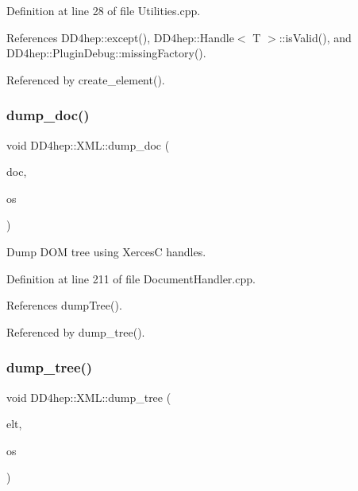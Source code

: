Definition at line 28 of file Utilities.\+cpp.



References D\+D4hep\+::except(), D\+D4hep\+::\+Handle$<$ T $>$\+::is\+Valid(), and D\+D4hep\+::\+Plugin\+Debug\+::missing\+Factory().



Referenced by create\+\_\+element().

\hypertarget{namespace_d_d4hep_1_1_x_m_l_ae465472cdddbe11a365f14b04b15b191}{}\label{namespace_d_d4hep_1_1_x_m_l_ae465472cdddbe11a365f14b04b15b191} 
\subsubsection{\texorpdfstring{dump\+\_\+doc()}{dump\_doc()}}
{\footnotesize\ttfamily void D\+D4hep\+::\+X\+M\+L\+::dump\+\_\+doc (\begin{DoxyParamCaption}\item[{D\+O\+M\+Document $\ast$}]{doc,  }\item[{ostream \&}]{os }\end{DoxyParamCaption})}



Dump D\+OM tree using XercesC handles. 



Definition at line 211 of file Document\+Handler.\+cpp.



References dump\+Tree().



Referenced by dump\+\_\+tree().

\hypertarget{namespace_d_d4hep_1_1_x_m_l_a1130069b87e258d98105350c812835dd}{}\label{namespace_d_d4hep_1_1_x_m_l_a1130069b87e258d98105350c812835dd} 
\subsubsection{\texorpdfstring{dump\+\_\+tree()}{dump\_tree()}\hspace{0.1cm}{\footnotesize\ttfamily [1/6]}}
{\footnotesize\ttfamily void D\+D4hep\+::\+X\+M\+L\+::dump\+\_\+tree (\begin{DoxyParamCaption}\item[{\hyperlink{class_d_d4hep_1_1_x_m_l_1_1_handle__t}{Handle\+\_\+t}}]{elt,  }\item[{ostream \&}]{os }\end{DoxyParamCaption})}



